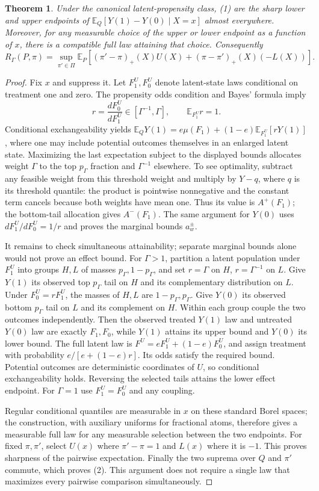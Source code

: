 \documentclass[11pt]{article}
\newtheorem{theorem}{Theorem}
\theoremstyle{definition}
\begin{document}
\begin{theorem}
Under the canonical latent-propensity class, (1) are the sharp lower and
upper endpoints of $\mathbb E_Q[Y(1)-Y(0)\mid X=x]$ almost everywhere.
Moreover, for any measurable choice of the upper or lower endpoint as
a function of $x$, there is a compatible full law attaining that choice.
Consequently
\[
 R_\Gamma(P,\pi)=\sup_{\pi'\in\Pi}\mathbb E_P\left[
 (\pi'-\pi)_+(X)U(X)+(\pi-\pi')_+(X)(-L(X))\right].      \tag{2}
\]
\end{theorem}
\begin{proof}
Fix $x$ and suppress it. Let $F_1^U,F_0^U$ denote latent-state laws
conditional on treatment one and zero. The propensity odds condition
and Bayes' formula imply
\[
 r=\frac{dF_0^U}{dF_1^U}\in[\Gamma^{-1},\Gamma],\qquad
 \mathbb E_{F_1^U}r=1.
\]
Conditional exchangeability yields
$\mathbb E_QY(1)=e\mu(F_1)+(1-e)\mathbb E_{F_1^U}[rY(1)]$,
where one may include potential outcomes themselves in an enlarged latent
state. Maximizing the last expectation subject to the displayed bounds
allocates weight $\Gamma$ to the top $p_\Gamma$ fraction and
$\Gamma^{-1}$ elsewhere. To see optimality, subtract any feasible weight
from this threshold weight and multiply by $Y-q$, where $q$ is its
threshold quantile: the product is pointwise nonnegative and the constant
term cancels because both weights have mean one. Thus its value is
$A^+(F_1)$; the bottom-tail allocation gives $A^-(F_1)$.
The same argument for $Y(0)$ uses $dF_1^U/dF_0^U=1/r$ and proves the
marginal bounds $a_w^\pm$.

It remains to check simultaneous attainability; separate marginal bounds
alone would not prove an effect bound. For $\Gamma>1$, partition a latent
population under $F_1^U$ into groups $H,L$ of masses
$p_\Gamma,1-p_\Gamma$, and set $r=\Gamma$ on $H$,
$r=\Gamma^{-1}$ on $L$. Give $Y(1)$ its observed top $p_\Gamma$ tail
on $H$ and its complementary distribution on $L$. Under $F_0^U=rF_1^U$,
the masses of $H,L$ are $1-p_\Gamma,p_\Gamma$.
Give $Y(0)$ its observed bottom $p_\Gamma$ tail on $L$ and its complement
on $H$. Within each group couple the two outcomes independently.
Then the observed treated $Y(1)$ law and untreated $Y(0)$ law are exactly
$F_1,F_0$, while $Y(1)$ attains its upper bound and $Y(0)$ its lower bound.
The full latent law is $F^U=eF_1^U+(1-e)F_0^U$, and assign treatment with
probability $e/[e+(1-e)r]$. Its odds satisfy the required bound.
Potential outcomes are deterministic coordinates of $U$, so conditional
exchangeability holds. Reversing the selected tails attains the lower
effect endpoint. For $\Gamma=1$ use $F_1^U=F_0^U$ and any coupling.

Regular conditional quantiles are measurable in $x$ on these standard
Borel spaces; the construction, with auxiliary uniforms for fractional
atoms, therefore gives a measurable full law for any measurable selection
between the two endpoints. For fixed $\pi,\pi'$, select $U(x)$ where
$\pi'-\pi=1$ and $L(x)$ where it is $-1$. This proves sharpness of the
pairwise expectation. Finally the two suprema over $Q$ and $\pi'$ commute,
which proves (2). This argument does not require a single law that
maximizes every pairwise comparison simultaneously.
\end{proof}
\end{document}
